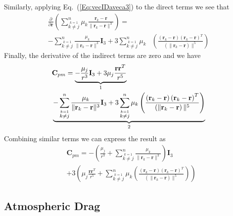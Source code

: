 Similarly, applying Eq.~(\ref{Eq:vecIDaveca3}) to the direct terms
we see that
%
\begin{equation}\begin{split}
     \frac{\partial }{\partial \mathbf{r}} \left( \sum_{\stackrel{k=1}{k \neq j}}^{n} \mu_k \frac{\mathbf{r}_{k} -
     \mathbf{r}}{\| \mathbf{r}_{k} - \mathbf{r}\|^3}\right) = &\\ -\sum_{\stackrel{k=1}{k \neq j}}^{n}
     \frac{\mu_k}{\| \mathbf{r}_{k} - \mathbf{r}\|^3}\mathbf{I}_3 + 3\sum_{\stackrel{k=1}{k \neq
     j}}^{n}\mu_k &\left( \frac{\left( \mathbf{r}_{k} - \mathbf{r} \right)\left( \mathbf{r}_{k} -
     \mathbf{r} \right)^T}{\left( \|\mathbf{r}_{k} - \mathbf{r} \right)\|^5}  \right)
     \end{split}
\end{equation}
%
Finally, the derivative of the indirect terms are zero and we have
%
\begin{equation} \begin{split}
   &\mathbf{C}_{pm} =  \underbrace{-\frac{\mu_j}{r^3} \mathbf{I}_3
     + 3\mu_j\frac{\mathbf{r}\mathbf{r}^T}{r^5}}_{ 1 }\\
      &\underbrace{
     -  \sum_{\stackrel{k=1}{k \neq j}}^{n}
     \frac{\mu_k}{\| \mathbf{r}_{k} - \mathbf{r}\|^3}\mathbf{I}_3 + 3\sum_{\stackrel{k=1}{k \neq
     j}}^{n} \mu_k \left( \frac{\left( \mathbf{r}_{k} - \mathbf{r} \right)\left( \mathbf{r}_{k} -
     \mathbf{r} \right)^T}{\left( \|\mathbf{r}_{k} - \mathbf{r} \right)\|^5}  \right)
       }_{2}
     \end{split}
\end{equation}
%
Combining similar terms we can express the result as
%
\begin{equation} \begin{split}
   &\mathbf{C}_{pm} =  -  \left( \frac{\mu_j}{r^3} + \sum_{\stackrel{k=1}{k \neq j}}^{n}
     \frac{\mu_k}{\| \mathbf{r}_{k} - \mathbf{r}\|^3} \right)\mathbf{I}_3 \\
      &
     + 3 \left( \mu_j\frac{\mathbf{r}\mathbf{r}^T}{r^5}
       + \sum_{\stackrel{k=1}{k \neq
     j}}^{n} \mu_k \left( \frac{\left( \mathbf{r}_{k} - \mathbf{r} \right)\left( \mathbf{r}_{k} -
     \mathbf{r} \right)^T}{\left( \|\mathbf{r}_{k} - \mathbf{r} \right)\|^5}
     \right) \right)
     \end{split}
\end{equation}


\subsection{Atmospheric Drag}

